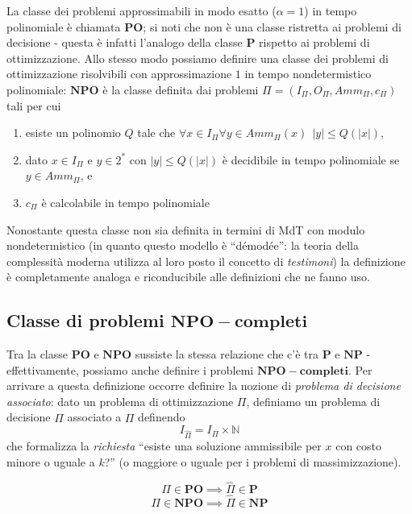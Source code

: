 La classe dei problemi approssimabili in modo esatto ($\alpha = 1$) 
in tempo polinomiale è chiamata $\mathbf{PO}$; si noti che non è una classe 
ristretta ai problemi di decisione - questa è infatti l'analogo della 
classe $\mathbf{P}$ rispetto ai problemi di ottimizzazione. 
Allo stesso modo possiamo definire una classe dei problemi 
di ottimizzazione risolvibili con approssimazione $1$ in tempo nondetermistico 
polinomiale: $\mathbf{NPO}$ è la classe definita dai 
problemi $\Pi = (I_{\Pi}, O_{\Pi}, Amm_{\Pi}, c_{\Pi})$ tali per cui
\begin{enumerate}
  \item esiste un polinomio $Q$ tale che $\forall x \in I_{\Pi} \forall y \in Amm_{\Pi}(x) ~~ |y| \leq Q(|x|)$,
  \item dato $x \in I_{\Pi}$ e $y \in 2^*$ con $|y| \leq Q(|x|)$ è decidibile in
    tempo polinomiale se $y \in Amm_{\Pi}$, e
  \item $c_{\Pi}$ è calcolabile in tempo polinomiale
\end{enumerate}
Nonostante questa classe non sia definita in termini di MdT con modulo nondetermistico (in quanto 
questo modello è ``démodée'': la teoria della complessità moderna utilizza al loro 
posto il concetto di \textit{testimoni}) la definizione è completamente analoga e
riconducibile alle definizioni che ne fanno uso.

\subsection{Classe di problemi $\mathbf{NPO-completi}$}
Tra la classe $\mathbf{PO}$ e $\mathbf{NPO}$ sussiste la stessa relazione 
che c'è tra $\mathbf{P}$ e $\mathbf{NP}$ - effettivamente, possiamo anche definire 
i problemi $\mathbf{NPO-completi}$. Per arrivare a questa definizione occorre 
definire la nozione di \textit{problema di decisione associato}: dato un problema 
di ottimizzazione $\Pi$, definiamo un problema di decisione $\hat{\Pi}$ associato 
a $\Pi$ definendo 
$$
I_{\hat{\Pi}} = I_{\Pi} \times \mathbb{N}
$$ 
che formalizza la \textit{richiesta} ``esiste una soluzione ammissibile 
per $x$ con costo minore o uguale a $k$?'' (o maggiore o uguale per i problemi 
di massimizzazione). 

\begin{theorem}
 $$
 \Pi \in \mathbf{PO} \implies \hat{\Pi} \in \mathbf{P}
 $$
 $$
 \Pi \in \mathbf{NPO} \implies \hat{\Pi} \in \mathbf{NP}
 $$
\end{theorem}

